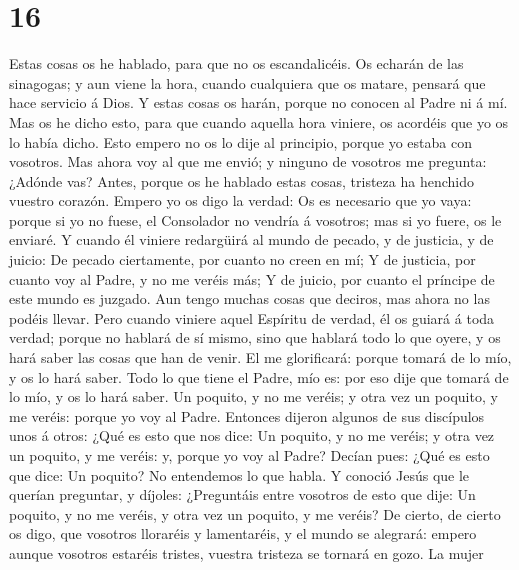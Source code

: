 \hypertarget{section-15}{%
\section{16}\label{section-15}}

 Estas cosas os he hablado, para que no os escandalicéis.
 Os echarán de las sinagogas; y aun viene la hora, cuando
cualquiera que os matare, pensará que hace servicio á Dios.
 Y estas cosas os harán, porque no conocen al Padre ni á
mí.  Mas os he dicho esto, para que cuando aquella hora
viniere, os acordéis que yo os lo había dicho. Esto empero no os lo dije
al principio, porque yo estaba con vosotros.  Mas ahora
voy al que me envió; y ninguno de vosotros me pregunta: ¿Adónde vas?
 Antes, porque os he hablado estas cosas, tristeza ha
henchido vuestro corazón.  Empero yo os digo la verdad: Os
es necesario que yo vaya: porque si yo no fuese, el Consolador no
vendría á vosotros; mas si yo fuere, os le enviaré.  Y
cuando él viniere redargüirá al mundo de pecado, y de justicia, y de
juicio:  De pecado ciertamente, por cuanto no creen en mí;
 Y de justicia, por cuanto voy al Padre, y no me veréis
más;  Y de juicio, por cuanto el príncipe de este mundo
es juzgado.  Aun tengo muchas cosas que deciros, mas
ahora no las podéis llevar.  Pero cuando viniere aquel
Espíritu de verdad, él os guiará á toda verdad; porque no hablará de sí
mismo, sino que hablará todo lo que oyere, y os hará saber las cosas que
han de venir.  El me glorificará: porque tomará de lo
mío, y os lo hará saber.  Todo lo que tiene el Padre, mío
es: por eso dije que tomará de lo mío, y os lo hará saber.
 Un poquito, y no me veréis; y otra vez un poquito, y me
veréis: porque yo voy al Padre.  Entonces dijeron algunos
de sus discípulos unos á otros: ¿Qué es esto que nos dice: Un poquito, y
no me veréis; y otra vez un poquito, y me veréis: y, porque yo voy al
Padre?  Decían pues: ¿Qué es esto que dice: Un poquito?
No entendemos lo que habla.  Y conoció Jesús que le
querían preguntar, y díjoles: ¿Preguntáis entre vosotros de esto que
dije: Un poquito, y no me veréis, y otra vez un poquito, y me veréis?
 De cierto, de cierto os digo, que vosotros lloraréis y
lamentaréis, y el mundo se alegrará: empero aunque vosotros estaréis
tristes, vuestra tristeza se tornará en gozo.  La mujer
